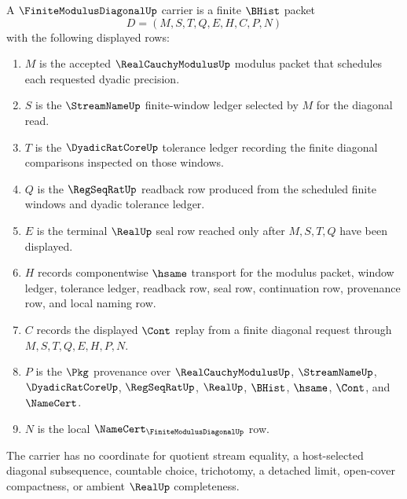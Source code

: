 \begin{definition}
\label{def:finite-modulus-diagonal-carrier}
A $\FiniteModulusDiagonalUp$ carrier is a finite $\BHist$ packet
$$
D=(M,S,T,Q,E,H,C,P,N)
$$
with the following displayed rows:
\begin{enumerate}
\item $M$ is the accepted $\RealCauchyModulusUp$ modulus packet that schedules each requested dyadic precision.
\item $S$ is the $\StreamNameUp$ finite-window ledger selected by $M$ for the diagonal read.
\item $T$ is the $\DyadicRatCoreUp$ tolerance ledger recording the finite diagonal comparisons inspected on those windows.
\item $Q$ is the $\RegSeqRatUp$ readback row produced from the scheduled finite windows and dyadic tolerance ledger.
\item $E$ is the terminal $\RealUp$ seal row reached only after $M,S,T,Q$ have been displayed.
\item $H$ records componentwise $\hsame$ transport for the modulus packet, window ledger, tolerance ledger, readback row, seal row, continuation row, provenance row, and local naming row.
\item $C$ records the displayed $\Cont$ replay from a finite diagonal request through $M,S,T,Q,E,H,P,N$.
\item $P$ is the $\Pkg$ provenance over $\RealCauchyModulusUp$, $\StreamNameUp$, $\DyadicRatCoreUp$, $\RegSeqRatUp$, $\RealUp$, $\BHist$, $\hsame$, $\Cont$, and $\NameCert$.
\item $N$ is the local $\NameCert_{\FiniteModulusDiagonalUp}$ row.
\end{enumerate}
The carrier has no coordinate for quotient stream equality, a host-selected diagonal subsequence, countable choice, trichotomy, a detached limit, open-cover compactness, or ambient $\RealUp$ completeness.
\end{definition}

